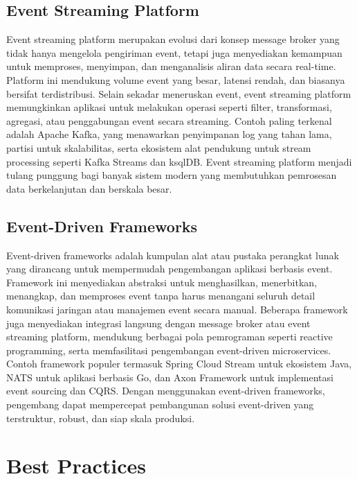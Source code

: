 \subsection{Event Streaming Platform}
Event streaming platform merupakan evolusi dari konsep message broker yang tidak hanya mengelola pengiriman event, tetapi juga menyediakan kemampuan untuk memproses, menyimpan, dan menganalisis aliran data secara real-time. Platform ini mendukung volume event yang besar, latensi rendah, dan biasanya bersifat terdistribusi. Selain sekadar meneruskan event, event streaming platform memungkinkan aplikasi untuk melakukan operasi seperti filter, transformasi, agregasi, atau penggabungan event secara streaming. Contoh paling terkenal adalah Apache Kafka, yang menawarkan penyimpanan log yang tahan lama, partisi untuk skalabilitas, serta ekosistem alat pendukung untuk stream processing seperti Kafka Streams dan ksqlDB. Event streaming platform menjadi tulang punggung bagi banyak sistem modern yang membutuhkan pemrosesan data berkelanjutan dan berskala besar.

\subsection{Event-Driven Frameworks}
Event-driven frameworks adalah kumpulan alat atau pustaka perangkat lunak yang dirancang untuk mempermudah pengembangan aplikasi berbasis event. Framework ini menyediakan abstraksi untuk menghasilkan, menerbitkan, menangkap, dan memproses event tanpa harus menangani seluruh detail komunikasi jaringan atau manajemen event secara manual. Beberapa framework juga menyediakan integrasi langsung dengan message broker atau event streaming platform, mendukung berbagai pola pemrograman seperti reactive programming, serta memfasilitasi pengembangan event-driven microservices. Contoh framework populer termasuk Spring Cloud Stream untuk ekosistem Java, NATS untuk aplikasi berbasis Go, dan Axon Framework untuk implementasi event sourcing dan CQRS. Dengan menggunakan event-driven frameworks, pengembang dapat mempercepat pembangunan solusi event-driven yang terstruktur, robust, dan siap skala produksi.


\section{Best Practices}

